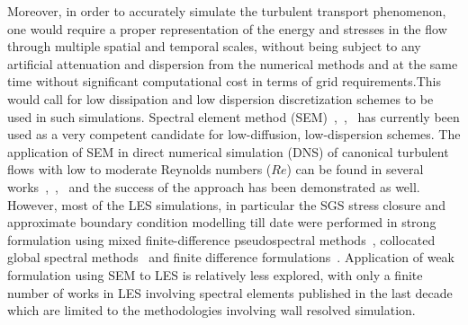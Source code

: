 \documentclass[times]{fldauth}
\begin{document}
Moreover, in order to accurately simulate the turbulent transport phenomenon, one would require a proper representation of the energy and stresses in the flow through multiple spatial and temporal scales, without being subject to any artificial attenuation and dispersion from the numerical methods and at the same time without significant computational cost in terms of grid requirements.This would call for low dissipation and low dispersion discretization schemes to be used in such simulations. Spectral element method (SEM)~\cite{patera1},~\cite{patera2},~\cite{deville} has currently been used as a very competent candidate for low-diffusion, low-dispersion schemes. The application of SEM in direct numerical simulation (DNS) of canonical turbulent flows with low to moderate Reynolds numbers ($Re$) can be found in several works~\cite{ranjan},~\cite{noorani},~\cite{vinuesa} and the success of the approach has been demonstrated as well. However, most of the LES simulations, in particular the SGS stress closure and approximate boundary condition modelling till date were performed in strong formulation using mixed finite-difference pseudospectral methods~\cite{schumann,kimmoinmoser,porte1fun,meyers2}, collocated global spectral methods~\cite{grinstein2007implicit,lodato,bian} and finite difference formulations~\cite{pio3,bal2,bal3,pio2,dhkim}. Application of weak formulation using SEM to LES is relatively less explored, with only a finite number of works in LES involving spectral elements published in the last decade~\cite{karmanos,black,bouf,wasberg} which are limited to the methodologies involving wall resolved simulation. 
\par
\end{document}
